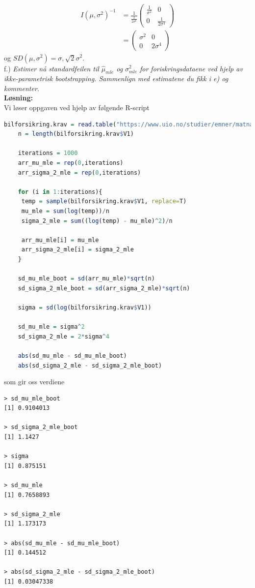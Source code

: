 \documentclass[12pt,
               a4paper,
               article,
               oneside,
               oldfontcommands,
               norsk]{memoir}
\begin{document}
\begin{align*}
    I(\mu, \sigma^2)^{-1} &= \frac{1}{\frac{1}{2 \sigma^6}} 
    \begin{pmatrix}
        \frac{1}{\sigma^2} & 0\\[3pt]
        0 & \frac{1}{2 \sigma^4}
    \end{pmatrix}\\[7pt]
    &=  \begin{pmatrix}
       \sigma^2 & 0\\[3pt]
        0 & 2 \sigma^4
    \end{pmatrix}
\end{align*}
og $SD(\mu, \sigma^2) = \sigma, \sqrt{2}\sigma^2$. \vspace{4mm}\\ 
f.) \emph{Estimer nå standardfeilen til $\hat{\mu}_{mle}$ og $\sigma^2_{mle}$ for foriskringsdataene ved hjelp av ikke-parametrisk bootstrapping. Sammenlign med estimatene du fikk i e) og kommenter.
}\vspace{3mm}\\
\textbf{Løsning:}\vspace{3mm}\\
Vi løser oppgaven ved hjelp av følgende R-script \vspace{4mm}\\
\begin{lstlisting}[language=R]
    bilforsikring.krav = read.table("https://www.uio.no/studier/emner/matnat/math/STK1110/data/forsikringskrav.txt")
    n = length(bilforsikring.krav$V1)
    
    iterations = 1000
    arr_mu_mle = rep(0,iterations)
    arr_sigma_2_mle = rep(0,iterations)
    
    for (i in 1:iterations){
     temp = sample(bilforsikring.krav$V1, replace=T)  
     mu_mle = sum(log(temp))/n
     sigma_2_mle = sum((log(temp) - mu_mle)^2)/n 
     
     arr_mu_mle[i] = mu_mle
     arr_sigma_2_mle[i] = sigma_2_mle
    }
    
    sd_mu_mle_boot = sd(arr_mu_mle)*sqrt(n)
    sd_sigma_2_mle_boot = sd(arr_sigma_2_mle)*sqrt(n)
    
    sigma = sd(log(bilforsikring.krav$V1))
    
    sd_mu_mle = sigma^2
    sd_sigma_2_mle = 2*sigma^4
    
    abs(sd_mu_mle - sd_mu_mle_boot)
    abs(sd_sigma_2_mle - sd_sigma_2_mle_boot)
\end{lstlisting}
som gir oss verdiene 
\begin{verbatim}
> sd_mu_mle_boot
[1] 0.9104013

> sd_sigma_2_mle_boot
[1] 1.1427

> sigma
[1] 0.875151

> sd_mu_mle
[1] 0.7658893

> sd_sigma_2_mle
[1] 1.173173

> abs(sd_mu_mle - sd_mu_mle_boot)
[1] 0.144512

> abs(sd_sigma_2_mle - sd_sigma_2_mle_boot)
[1] 0.03047338
\end{verbatim}
\end{document}
